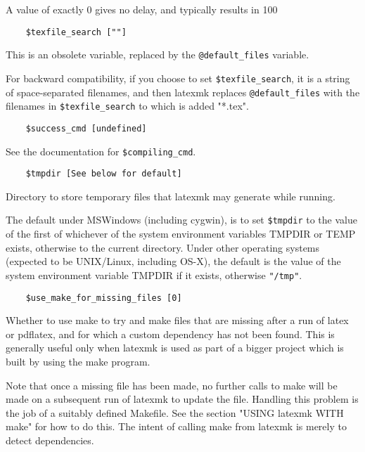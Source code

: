 A  value  of  exactly 0 gives no delay, and typically results in
100%

\begin{verbatim}
	$texfile_search [""]
\end{verbatim}

This is an obsolete variable,  replaced  by  the  \verb|@default_files|
variable.

For   backward   compatibility,  if  you  choose  to  set
\verb|$texfile_search|, it is a string of  space-separated  filenames,  and
then latexmk replaces \verb|@default_files| with the filenames in
\verb|$texfile_search| to which is added "*.tex".

\begin{verbatim}
	$success_cmd [undefined]
\end{verbatim}

See the documentation for \verb|$compiling_cmd|.

\begin{verbatim}
	$tmpdir [See below for default]
\end{verbatim}

Directory to store temporary files  that  latexmk  may  generate
while running.

The  default  under MSWindows (including cygwin), is to set \verb|$tmpdir| to
the value of the first of whichever of the system  environment  variables
TMPDIR or TEMP exists, otherwise to the current directory.  Under other
operating systems (expected  to  be UNIX/Linux,  including  OS-X),  the
default is the value of the system environment  variable  TMPDIR  if  it
exists,  otherwise \verb|"/tmp"|.

\begin{verbatim}
	$use_make_for_missing_files [0]
\end{verbatim}

Whether to use make to try and make files that are missing after
a run of latex or pdflatex, and for which  a  custom  dependency
has  not been found.  This is generally useful only when latexmk
is used as part of a bigger project which is built by using  the
make program.

Note that once a missing file has been made, no further calls to
make will be made on a subsequent run of latexmk to  update  the
file.   Handling  this  problem is the job of a suitably defined
Makefile.  See the section "USING latexmk WITH make" for how  to
do  this.   The intent of calling make from latexmk is merely to
detect dependencies.

